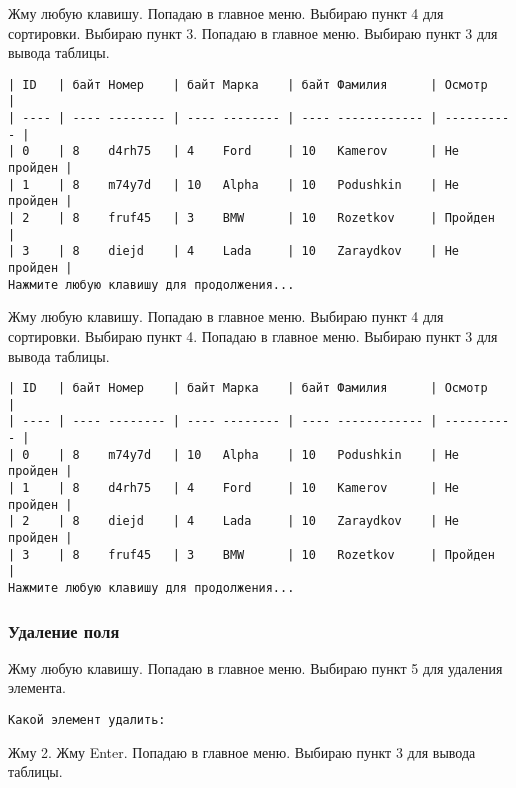 Жму любую клавишу. Попадаю в главное меню. Выбираю пункт 4 для сортировки. Выбираю пункт 3. Попадаю в главное меню. Выбираю пункт 3 для вывода таблицы.

\begin{tcolorbox}
\begin{verbatim}
| ID   | байт Номер    | байт Марка    | байт Фамилия      | Осмотр     |
| ---- | ---- -------- | ---- -------- | ---- ------------ | ---------- |
| 0    | 8    d4rh75   | 4    Ford     | 10   Kamerov      | Не пройден |
| 1    | 8    m74y7d   | 10   Alpha    | 10   Podushkin    | Не пройден |
| 2    | 8    fruf45   | 3    BMW      | 10   Rozetkov     | Пройден    |
| 3    | 8    diejd    | 4    Lada     | 10   Zaraydkov    | Не пройден |
Нажмите любую клавишу для продолжения...
\end{verbatim}
\end{tcolorbox}

Жму любую клавишу. Попадаю в главное меню. Выбираю пункт 4 для сортировки. Выбираю пункт 4. Попадаю в главное меню. Выбираю пункт 3 для вывода таблицы.

\begin{tcolorbox}
\begin{verbatim}
| ID   | байт Номер    | байт Марка    | байт Фамилия      | Осмотр     |
| ---- | ---- -------- | ---- -------- | ---- ------------ | ---------- |
| 0    | 8    m74y7d   | 10   Alpha    | 10   Podushkin    | Не пройден |
| 1    | 8    d4rh75   | 4    Ford     | 10   Kamerov      | Не пройден |
| 2    | 8    diejd    | 4    Lada     | 10   Zaraydkov    | Не пройден |
| 3    | 8    fruf45   | 3    BMW      | 10   Rozetkov     | Пройден    |
Нажмите любую клавишу для продолжения...
\end{verbatim}
\end{tcolorbox}

\subsubsection{Удаление поля}

Жму любую клавишу. Попадаю в главное меню. Выбираю пункт 5 для удаления элемента.

\begin{tcolorbox}
\begin{verbatim}
Какой элемент удалить:
\end{verbatim}
\end{tcolorbox}

Жму 2. Жму Enter. Попадаю в главное меню. Выбираю пункт 3 для вывода таблицы.

